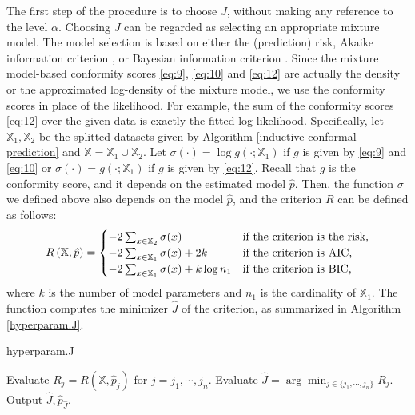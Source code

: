 The first step of the procedure is to choose $J$, without making any reference to the level $\alpha$. Choosing $J$ can be regarded as selecting an appropriate mixture model. The model selection is based on either the (prediction) risk, Akaike information criterion \citep{Akaike:1974}, or Bayesian information criterion \citep{Schwarz:1978}. Since the mixture model-based conformity scores \eqref{eq:9}, \eqref{eq:10} and \eqref{eq:12} are actually the density or the approximated log-density of the mixture model, we use the conformity scores in place of the likelihood. For example, the sum of the conformity scores \eqref{eq:12} over the given data is exactly the fitted log-likelihood. Specifically, let $\mathbb{X}_1,\mathbb{X}_2$ be the splitted datasets given by Algorithm \ref{inductive conformal prediction} and $\mathbb{X} = \mathbb{X}_1\cup\mathbb{X}_2$. Let $\sigma(\cdot) = \log g\left(\cdot;\mathbb{X}_1\right)$ if $g$ is given by \eqref{eq:9} and \eqref{eq:10} or $\sigma(\cdot) = g\left(\cdot;\mathbb{X}_1\right)$ if $g$ is given by \eqref{eq:12}. Recall that $g$ is the conformity score, and it depends on the estimated model $\hat{p}$. Then, the function $\sigma$ we defined above also depends on the model $\hat{p}$, and the criterion $R$ can be defined as follows:
\begin{align}\notag
R\left(\mathbb{X},\hat{p}\right) =
\begin{cases}
-2\sum_{x\in\mathbb{X}_2}\sigma(x) & \mbox{if the criterion is the risk,} \\
-2\sum_{x\in\mathbb{X}_1}\sigma(x) + 2k & \mbox{if the criterion is AIC,}\\
-2\sum_{x\in\mathbb{X}_1}\sigma(x) + k\log n_1 & \mbox{if the criterion is BIC,}
\end{cases}
\end{align}
where $k$ is the number of model parameters and $n_1$ is the cardinality of $\mathbb{X}_1$. The function  computes the minimizer $\hat{J}$ of the criterion, as summarized in Algorithm \ref{hyperparam.J}.

\begin{algorithm}[hbt!]
\caption{hyperparam.J}\label{hyperparam.J}
\begin{algorithmic}[1]
  \State Evaluate $R_j = R\left(\mathbb{X},\hat{p}_j\right)$  for $j = j_1,\cdots, j_n$.
  \State Evaluate $\hat{J} = \arg\min_{j\in \{j_1,\cdots,j_n\}}R_j$.
  \State Output $\hat{J},\hat{p}_{\hat{J}}$.
\EndProcedure
\end{algorithmic}
\end{algorithm}

